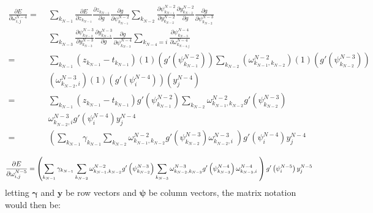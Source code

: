\documentclass{article}
\begin{document}
\begin{equation} \label{eq:derive_du_nm4}
\begin{aligned}
\frac{\partial E}{\partial \omega_{i,j}^{N-4}} =& \;
%
\sum_{k_{N-1}}
\frac{\partial E}{\partial z_{k_{N-1}}}
\frac{\partial z_{k_{N-1}}}{\partial g}
\frac{\partial g}{\partial \psi_{k_{N-1}}^{N-2}}
%
\sum_{k_{N-2}}
\frac{\partial \psi_{k_{N-1}}^{N-2}}{\partial y_{k_{N-2}}^{N-2}}
\frac{\partial y_{k_{N-2}}^{N-2}}{\partial g}
\frac{\partial g}{\partial \psi_{k_{N-2}}^{N-3}} \\
%
& \;\sum_{k_{N-3}}
\frac{\partial \psi_{k_{N-2}}^{N-3}}{\partial y_{k_{N-3}}^{N-3}}
\frac{\partial y_{k_{N-3}}^{N-3}}{\partial g}
\frac{\partial g}{\partial \psi_{k_{N-3}}^{N-4}}
%
\sum_{k_{N-4}=i}
\frac{\partial \psi_{k_{N-3}}^{N-4}}{\partial \omega_{k_{N-4,j}}^{N-4}} \\
=& \; \sum_{k_{N-1}}
\left( z_{k_{N-1}} - t_{k_{N-1}} \right)
%
(1)
\left( g' \left( \psi_{k_{N-1}}^{N-2} \right) \right)
%
\sum_{k_{N-2}}
\left( \omega_{k_{N-1},k_{N-2}}^{N-2} \right)
(1)
\left( g' (\psi_{k_{N-2}}^{N-3}) \right) \\
%
& \; \left( \omega_{k_{N-2},i}^{N-3} \right)
(1)
\left( g' (\psi_i^{N-4}) \right)
%
\left( y_j^{N-4} \right) \\
=& \;
\sum_{k_{N-1}}
\left( z_{k_{N-1}} - t_{k_{N-1}} \right)
g' \left( \psi_{k_{N-1}}^{N-2} \right)
%
\sum_{k_{N-2}}
\omega_{k_{N-1},k_{N-2}}^{N-2}
g' \left( \psi_{k_{N-2}}^{N-3} \right) \\
%
& \; \omega_{k_{N-2},i}^{N-3}
g' \left( \psi_i^{N-4} \right)
y_j^{N-4} \\
=& \;
\left(
\sum_{k_{N-1}}
\gamma_{k_{N-1}}
%
\sum_{k_{N-2}}
\omega_{k_{N-1},k_{N-2}}^{N-2}
g' \left( \psi_{k_{N-2}}^{N-3} \right)
%
\omega_{k_{N-2},i}^{N-3} \;
\right)
g' \left( \psi_i^{N-4} \right)
y_j^{N-4} \\
\end{aligned}
\end{equation}
%
\begin{equation} \label{eq:derive_du_nm5}
\frac{\partial E}{\partial \omega_{i,j}^{N-5}} =
\left(
\sum_{k_{N-1}}
\gamma_{k_{N-1}}
%
\sum_{k_{N-2}}
\omega_{k_{N-1},k_{N-2}}^{N-2}
g' \left( \psi_{k_{N-2}}^{N-3} \right)
%
\sum_{k_{N-3}}
\omega_{k_{N-2},k_{N-3}}^{N-3}
g' \left( \psi_{k_{N-3}}^{N-4} \right)
%
\omega_{k_{N-3},i}^{N-4} \;
\right)
g' \left( \psi_i^{N-5} \right)
y_j^{N-5} \\
%
\end{equation}
%
letting $\bm{\gamma}$ and $\bm{y}$ be row vectors and $\bm{\psi}$ be column vectors, the matrix notation would then be:
\end{document}
